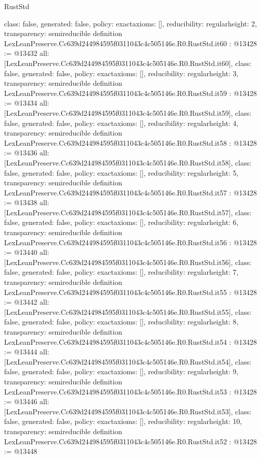 \begin{lexlean}{RustStd}
\begin{coremodule}
{  class: false,
  generated: false,
  policy: exact{axioms: []},
  reducibility: regular{height: 2},
  transparency: semireducible
}
definition LexLeanPreserve.Cc639d244984595f0311043c4c505146e.R0.RustStd.it60 : @13428 := @13432 {
  all: [LexLeanPreserve.Cc639d244984595f0311043c4c505146e.R0.RustStd.it60],
  class: false,
  generated: false,
  policy: exact{axioms: []},
  reducibility: regular{height: 3},
  transparency: semireducible
}
definition LexLeanPreserve.Cc639d244984595f0311043c4c505146e.R0.RustStd.it59 : @13428 := @13434 {
  all: [LexLeanPreserve.Cc639d244984595f0311043c4c505146e.R0.RustStd.it59],
  class: false,
  generated: false,
  policy: exact{axioms: []},
  reducibility: regular{height: 4},
  transparency: semireducible
}
definition LexLeanPreserve.Cc639d244984595f0311043c4c505146e.R0.RustStd.it58 : @13428 := @13436 {
  all: [LexLeanPreserve.Cc639d244984595f0311043c4c505146e.R0.RustStd.it58],
  class: false,
  generated: false,
  policy: exact{axioms: []},
  reducibility: regular{height: 5},
  transparency: semireducible
}
definition LexLeanPreserve.Cc639d244984595f0311043c4c505146e.R0.RustStd.it57 : @13428 := @13438 {
  all: [LexLeanPreserve.Cc639d244984595f0311043c4c505146e.R0.RustStd.it57],
  class: false,
  generated: false,
  policy: exact{axioms: []},
  reducibility: regular{height: 6},
  transparency: semireducible
}
definition LexLeanPreserve.Cc639d244984595f0311043c4c505146e.R0.RustStd.it56 : @13428 := @13440 {
  all: [LexLeanPreserve.Cc639d244984595f0311043c4c505146e.R0.RustStd.it56],
  class: false,
  generated: false,
  policy: exact{axioms: []},
  reducibility: regular{height: 7},
  transparency: semireducible
}
definition LexLeanPreserve.Cc639d244984595f0311043c4c505146e.R0.RustStd.it55 : @13428 := @13442 {
  all: [LexLeanPreserve.Cc639d244984595f0311043c4c505146e.R0.RustStd.it55],
  class: false,
  generated: false,
  policy: exact{axioms: []},
  reducibility: regular{height: 8},
  transparency: semireducible
}
definition LexLeanPreserve.Cc639d244984595f0311043c4c505146e.R0.RustStd.it54 : @13428 := @13444 {
  all: [LexLeanPreserve.Cc639d244984595f0311043c4c505146e.R0.RustStd.it54],
  class: false,
  generated: false,
  policy: exact{axioms: []},
  reducibility: regular{height: 9},
  transparency: semireducible
}
definition LexLeanPreserve.Cc639d244984595f0311043c4c505146e.R0.RustStd.it53 : @13428 := @13446 {
  all: [LexLeanPreserve.Cc639d244984595f0311043c4c505146e.R0.RustStd.it53],
  class: false,
  generated: false,
  policy: exact{axioms: []},
  reducibility: regular{height: 10},
  transparency: semireducible
}
definition LexLeanPreserve.Cc639d244984595f0311043c4c505146e.R0.RustStd.it52 : @13428 := @13448 {
}
\end{coremodule}
\end{lexlean}
